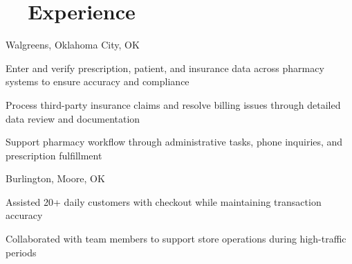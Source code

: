 \section[Experience]{\faBriefcase~~Experience}

\begin{experience}{Walgreens, Oklahoma City, OK}{
}
\item Enter and verify prescription, patient, and insurance data across pharmacy systems to ensure accuracy and compliance
\item Process third-party insurance claims and resolve billing issues through detailed data review and documentation
\item Support pharmacy workflow through administrative tasks, phone inquiries, and prescription fulfillment
\end{experience}

\begin{experience}[last]{Burlington, Moore, OK}{
}
\item Assisted 20+ daily customers with checkout while maintaining transaction accuracy
\item Collaborated with team members to support store operations during high-traffic periods
\end{experience}
